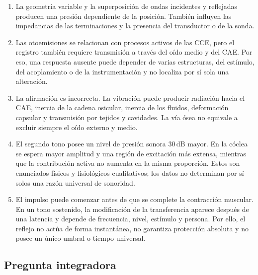 \begin{enumerate}[label=\textbf{A\arabic*.},leftmargin=*]
    \item La geometría variable y la superposición de ondas incidentes y
    reflejadas producen una presión dependiente de la posición. También
    influyen las impedancias de las terminaciones y la presencia del
    transductor o de la sonda.

    \item Las otoemisiones se relacionan con procesos activos de las CCE, pero
    el registro también requiere transmisión a través del oído medio y del
    CAE. Por eso, una respuesta ausente puede depender de varias estructuras,
    del estímulo, del acoplamiento o de la instrumentación y no localiza por
    sí sola una alteración.

    \item La afirmación es incorrecta. La vibración puede producir radiación
    hacia el CAE, inercia de la cadena osicular, inercia de los fluidos,
    deformación capsular y transmisión por tejidos y cavidades. La vía ósea no
    equivale a excluir siempre el oído externo y medio.

    \item El segundo tono posee un nivel de presión sonora
    \(30\,\text{dB}\) mayor. En la cóclea se espera mayor amplitud y una región
    de excitación más extensa, mientras que la contribución activa no aumenta
    en la misma proporción. Estos son enunciados físicos y fisiológicos
    cualitativos; los datos no determinan por sí solos una razón universal de
    sonoridad.

    \item El impulso puede comenzar antes de que se complete la contracción
    muscular. En un tono sostenido, la modificación de la transferencia
    aparece después de una latencia y depende de frecuencia, nivel, estímulo y
    persona. Por ello, el reflejo no actúa de forma instantánea, no garantiza
    protección absoluta y no posee un único umbral o tiempo universal.
\end{enumerate}

\subsection*{Pregunta integradora}

